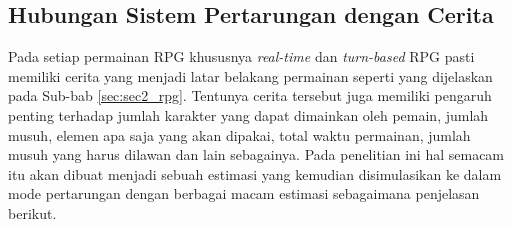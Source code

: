 \subsection{Hubungan Sistem Pertarungan dengan Cerita}
\label{sec:sub_sec3_story}
\vspace{1ex}

Pada setiap permainan RPG khususnya \textit{real-time} dan \textit{turn-based} RPG pasti memiliki cerita yang menjadi latar belakang permainan seperti yang dijelaskan pada Sub-bab \ref{sec:sec2_rpg}. Tentunya cerita tersebut juga memiliki pengaruh penting terhadap jumlah karakter yang dapat dimainkan oleh pemain, jumlah musuh, elemen apa saja yang akan dipakai, total waktu permainan, jumlah musuh yang harus dilawan dan lain sebagainya. Pada penelitian ini hal semacam itu akan dibuat menjadi sebuah estimasi yang kemudian disimulasikan ke dalam mode pertarungan dengan berbagai macam estimasi sebagaimana penjelasan berikut.

